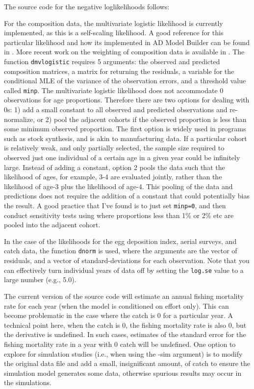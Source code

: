 \documentclass[12pt,letterpaper]{article}
\begin{document}
    The source code for the negative loglikelihoods follows:
    
    
    For the composition data, the multivariate logistic likelihood is currently implemented, as this is a self-scaling likelihood.  A good reference for this particular likelihood and how its implemented in AD Model Builder can be found in \cite{schnute1995influence}.  More recent work on the weighting of composition data is available in \cite{francis2011data}.  The function \texttt{dmvlogistic} requires 5 arguments: the observed and predicted composition matrices, a matrix for returning the residuals, a variable for the conditional MLE of the variance of the observation errors, and a threshold value called \texttt{minp}. The multivariate logistic likelihood does not accommodate 0 observations for age proportions.  Therefore there are two options for dealing with 0s: 1) add a small constant to all observed and predicted observations and re-normalize, or 2) pool the adjacent cohorts if the observed proportion is less than some minimum observed proportion.  The first option is widely used in programs such as stock synthesis, and is akin to manufacturing data.  If a particular cohort is relatively weak, and only partially selected, the sample size required to observed just one individual of a certain age in a given year could be infinitely large.  Instead of adding a constant, option 2 pools the data such that the likelihood of ages, for example, 3-4 are evaluated jointly, rather than the likelihood of age-3 plus the likelihood of age-4.  This pooling of the data and predictions does not require the addition of a constant that could potentially bias the result.  A good practice that I've found is to just set \texttt{minp=0}, and then conduct sensitivity tests using where proportions less than 1\% or 2\% etc are pooled into the adjacent cohort.

    In the case of the likelihoods for the egg deposition index, aerial surveys, and catch data, the function \texttt{dnorm} is used, where the arguments are the vector of residuals, and a vector of standard-deviations for each observation.  Note that you can effectively turn individual years of data off by setting the \texttt{log.se} value to a large number (e.g., 5.0).

    The current version of the source code will estimate an annual fishing mortality rate for each year (when the model is conditioned on effort only).  This can become problematic in the case where the catch is 0 for a particular year.  A technical point here, when the catch is 0, the fishing mortality rate is also 0, but the derivative is undefined.  In such cases, estimates of the standard error for the fishing mortality rate in a year with 0 catch will be undefined.  One option to explore for simulation studies (i.e., when using the -sim argument) is to modify the original data file and add a small, insignificant amount, of catch to ensure the simulation model generates some data, otherwise spurious results may occur in the simulations.
\end{document}
